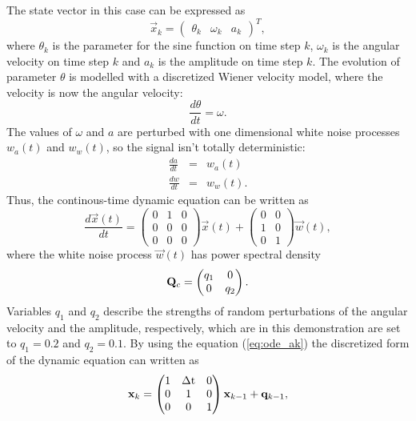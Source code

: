 The state vector in this case can be expressed as
%
\begin{equation}
%
\vec{x}_k = 
\begin{pmatrix}
\theta_k & \omega_k & a_k
\end{pmatrix}^T,
%
\end{equation}
%
where $\theta_k$ is the parameter for the sine function on time step
$k$, $\omega_k$ is the angular velocity on time step $k$ and $a_k$ is
the amplitude on time step $k$. The evolution of parameter $\theta$ is
modelled with a discretized Wiener velocity model, where the velocity
is now the angular velocity:
%
\begin{equation}
%
\frac{d \theta}{d t} = \omega.
%
\end{equation}
%
The values of $\omega$ and $a$ are perturbed with one dimensional
white noise processes $w_a(t)$ and $w_w(t)$, so the signal isn't
totally deterministic:
%
\begin{eqnarray}
%
\frac{da}{dt} &=& w_a(t) \\ \frac{dw}{dt} &=& w_w(t).
%
\end{eqnarray}
%
Thus, the continous-time dynamic equation can be written as
%
\begin{equation}
%
\frac{d \vec{x}(t)}{dt} = \begin{pmatrix} 0 & 1 & 0\\ 0 & 0 & 0\\ 0 &
0 & 0
\end{pmatrix}\vec{x}(t) +
\begin{pmatrix} 0 & 0 \\ 1 & 0 \\ 0 & 1
\end{pmatrix}\vec{w}(t), \label{eq:sine_cont_model}
%
\end{equation}
%
where the white noise process $\vec{w}(t)$ has power spectral density
%
\begin{equation}
%
\mat{Q}_c = \begin{pmatrix} q_1 & 0 \\ 0 & q_2
\end{pmatrix}.
%
\end{equation}
%
Variables $q_1$ and $q_2$ describe the strengths of random
perturbations of the angular velocity and the amplitude, respectively,
which are in this demonstration are set to $q_1 = 0.2$ and $q_2 =
0.1$. By using the equation (\ref{eq:ode_ak}) the discretized form of
the dynamic equation can written as
%
\begin{equation}
%
\vec{x}_k = \begin{pmatrix} 1 & \dt & 0\\ 0 & 1 & 0\\ 0 & 0 & 1
\end{pmatrix}\vec{x}_{k-1} + \vec{q}_{k-1},
%
\end{equation}
